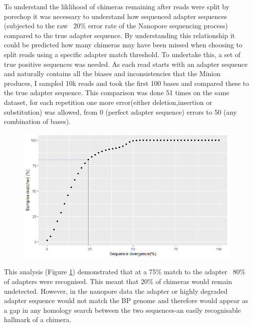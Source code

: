 To understand the liklihood of chimeras remaining after reads were split by porechop it was necessary to understand how sequenced adapter sequences (subjected to the raw ~20\% error rate of the Nanopore sequencing process) compared to the true adapter sequence. By understanding this relationship it could be predicted how many chimeras may have been missed when choosing to split reads using a specific adapter match threshold. To undertake this, a set of true positive sequences was needed. As each read starts with an adapter sequence and naturally contains all the biases and inconsistencies that the Minion produces, I sampled 10k reads and took the first 100 bases and compared these to the true adapter sequence. This comparison was done 51 times on the same dataset, for each repetition one more error(either deletion,insertion or substitution) was allowed, from 0 (perfect adapter sequence) errors to 50 (any combination of bases).




\begin{figure}[h!]
\centering
\includegraphics[width=\textwidth{}]{Chapter_2/Rplot01.png}
\caption{  }
\label{fig:First_rel}
\end{figure}

This analysis (Figure \ref{fig:First_rel}) demonstrated that at a 75\% match to the adapter ~80\% of adapters were recognised. This meant that 20\% of chimeras would remain undetected. However, in the nanopore data the adapter or highly degraded adapter sequence would not match the BP genome and therefore would appear as a gap in any homology search between the two sequences-an easily recognisable hallmark of a chimera.


